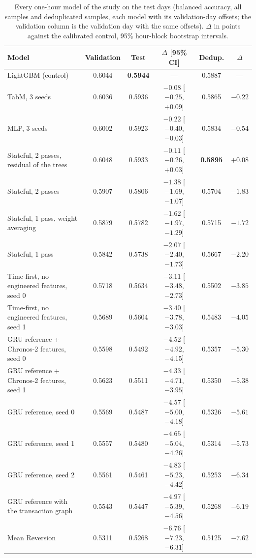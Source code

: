 \begin{table}[t]
\centering
\caption{Every one-hour model of the study on the test days (balanced accuracy, all samples
and deduplicated samples, each model with its validation-day offsets; the validation column
is the validation day with the same offsets).  $\Delta$ in points against the calibrated
control, 95\% hour-block bootstrap intervals.}
\label{tab:test:1h}
\footnotesize
\begin{fittable}\begin{tabular}{lccccc}
\toprule
Model & Validation & Test & $\Delta$ [95\% CI] & Dedup. & $\Delta$ \\
\midrule
LightGBM (control)                           & 0.6044 & \textbf{0.5944} & --- & 0.5887 & --- \\
TabM, 3 seeds                                & 0.6036 & 0.5936 & $-0.08$ [$-0.25$, $+0.09$] & 0.5865 & $-0.22$ \\
MLP, 3 seeds                                 & 0.6002 & 0.5923 & $-0.22$ [$-0.40$, $-0.03$] & 0.5834 & $-0.54$ \\
Stateful, 2 passes, residual of the trees    & 0.6048 & 0.5933 & $-0.11$ [$-0.26$, $+0.03$] & \textbf{0.5895} & $+0.08$ \\
Stateful, 2 passes                           & 0.5907 & 0.5806 & $-1.38$ [$-1.69$, $-1.07$] & 0.5704 & $-1.83$ \\
Stateful, 1 pass, weight averaging           & 0.5879 & 0.5782 & $-1.62$ [$-1.97$, $-1.29$] & 0.5715 & $-1.72$ \\
Stateful, 1 pass                             & 0.5842 & 0.5738 & $-2.07$ [$-2.40$, $-1.73$] & 0.5667 & $-2.20$ \\
Time-first, no engineered features, seed 0         & 0.5718 & 0.5634 & $-3.11$ [$-3.48$, $-2.73$] & 0.5502 & $-3.85$ \\
Time-first, no engineered features, seed 1         & 0.5689 & 0.5604 & $-3.40$ [$-3.78$, $-3.03$] & 0.5483 & $-4.05$ \\
GRU reference + Chronos-2 features, seed 0   & 0.5598 & 0.5492 & $-4.52$ [$-4.92$, $-4.15$] & 0.5357 & $-5.30$ \\
GRU reference + Chronos-2 features, seed 1   & 0.5623 & 0.5511 & $-4.33$ [$-4.71$, $-3.95$] & 0.5350 & $-5.38$ \\
GRU reference, seed 0                        & 0.5569 & 0.5487 & $-4.57$ [$-5.00$, $-4.18$] & 0.5326 & $-5.61$ \\
GRU reference, seed 1                        & 0.5557 & 0.5480 & $-4.65$ [$-5.04$, $-4.26$] & 0.5314 & $-5.73$ \\
GRU reference, seed 2                        & 0.5561 & 0.5461 & $-4.83$ [$-5.23$, $-4.42$] & 0.5253 & $-6.34$ \\
GRU reference with the transaction graph     & 0.5543 & 0.5447 & $-4.97$ [$-5.39$, $-4.56$] & 0.5268 & $-6.19$ \\
Mean Reversion                               & 0.5311 & 0.5268 & $-6.76$ [$-7.23$, $-6.31$] & 0.5125 & $-7.62$ \\
\bottomrule
\end{tabular}\end{fittable}
\end{table}


